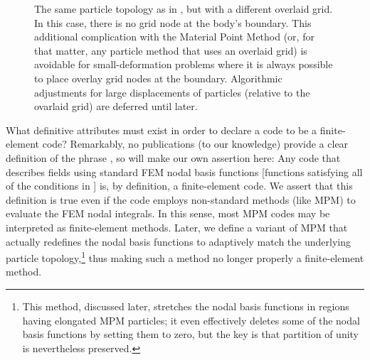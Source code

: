 %
\begin{figure}[h]
\caption{The same particle topology as in , but with a different overlaid grid. In this case, there is no grid node at the body's boundary. This additional complication with the Material Point Method (or, for that matter, any particle method that uses an overlaid grid) is avoidable for small-deformation problems where it is always possible to place overlay grid nodes at the boundary. Algorithmic adjustments for large displacements of particles (relative to the ovarlaid grid) are deferred until later.}
\label{fig:particlesOnOneDgridDifferent}
\end{figure}
%


What definitive attributes must exist in order to declare a code to be a finite-element code? Remarkably, no publications (to our knowledge) provide a clear definition of the phrase , so will make our own assertion here: Any code that describes fields using standard FEM nodal basis functions [\ie functions satisfying all of the conditions in ] is, by definition, a finite-element code. We assert that this definition is true even if the code employs non-standard methods (like MPM) to evaluate the FEM nodal integrals. In this sense, most MPM codes may be interpreted as finite-element methods. Later, we define a variant of MPM that actually redefines the nodal basis functions to adaptively match the underlying particle topology,\footnote{This method, discussed later, stretches the nodal basis functions in regions having elongated MPM particles; it even effectively deletes some of the nodal basis functions by setting them to zero, but the key is that partition of unity is nevertheless preserved.} thus making such a method no longer properly a finite-element method.
%



